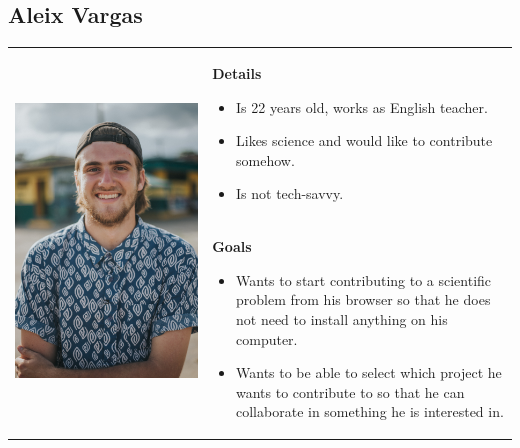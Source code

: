 \subsection*{Aleix Vargas}
\begin{table}[h]
\begin{tabular}{c p{}}
\multirow{2}{*}{
      \includegraphics[width=0.3\linewidth]{assets/images/man2.png}
} 
& 
\multicolumn{1}{p{0.7\textwidth}}{
\textbf{Details}
\begin{itemize}
	\item Is 22 years old, works as English teacher.
	\item Likes science and would like to contribute somehow.
	\item Is not tech-savvy.
\end{itemize}
} \\
&
\textbf{Goals} 
\begin{itemize}
	\item Wants to start contributing to a scientific problem from his browser so that he does not need to install anything on his computer.
	\item Wants to be able to select which project he wants to contribute to so that he can collaborate in something he is interested in.
\end{itemize}   
\end{tabular}
\end{table}




  